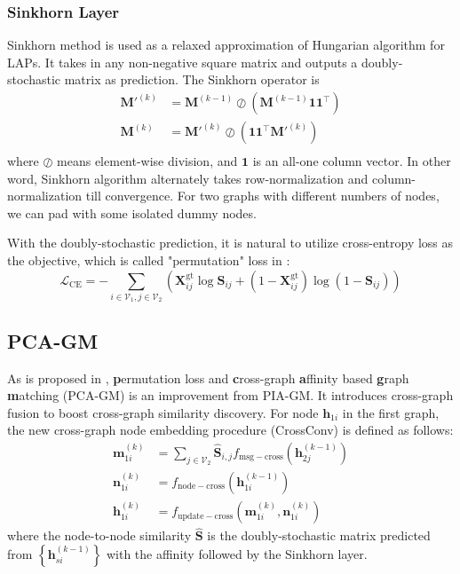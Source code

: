 \documentclass[a4paper]{article}
\newcommand{\set}[1]{\left\{#1\right\}}
\begin{document}
\subsubsection{Sinkhorn Layer}
Sinkhorn \cite{sinkhorn} method is used as a relaxed approximation of Hungarian algorithm \cite{hungarian} for LAPs. It takes in any non-negative square matrix and outputs a doubly-stochastic matrix as prediction. The Sinkhorn operator is
\begin{align}
    \mathbf{M}'^{(k)} &=\mathbf{M}^{(k-1)} \oslash \left(\mathbf{M}^{(k-1)}\mathbf{1}\mathbf{1}^\top\right)\\
    \mathbf{M}^{(k)} &=\mathbf{M}'^{(k)} \oslash \left(\mathbf{1}\mathbf{1}^\top\mathbf{M}'^{(k)}\right)\\
\end{align}
where $\oslash$ means element-wise division, and $\mathbf{1}$ is an all-one column vector. In other word, Sinkhorn algorithm alternately takes row-normalization and column-normalization till convergence. For two graphs with different numbers of nodes, we can pad with some isolated dummy nodes.

With the doubly-stochastic prediction, it is natural to utilize cross-entropy loss as the objective, which is called "permutation" loss in \cite{pca-ipca}:
$$
\mathcal{L}_{\mathrm{CE}} = -\sum_{i\in \mathcal{V}_1, j\in \mathcal{V}_2 } \left(\mathbf{X}_{ij}^{\mathrm{gt}} \log\mathbf{S}_{ij} + \left(1-\mathbf{X}_{ij}^{\mathrm{gt}}\right) \log \left(1- \mathbf{S}_{ij}\right) \right)
$$

\subsection{PCA-GM}
As is proposed in \cite{pca-ipca}, \textbf{p}ermutation loss and \textbf{c}ross-graph \textbf{a}ffinity based \textbf{g}raph \textbf{m}atching (PCA-GM) is an improvement from PIA-GM. It introduces cross-graph fusion to boost cross-graph similarity discovery. For node $\mathbf{h}_{1i}$ in the first graph, the new cross-graph node embedding procedure (CrossConv) is defined as follows:
\begin{align}
    \mathbf{m}_{1i}^{(k)} &= \sum_{j\in \mathcal{V}_2} \hat{\mathbf{S}}_{i,j} f_{\mathrm{msg-cross}}\left(\mathbf{h}_{2j}^{(k-1)}\right)\\
    \mathbf{n}_{1i}^{(k)} &= f_{\mathrm{node-cross}}\left( \mathbf{h}_{1i}^{(k-1)} \right)\\
    \mathbf{h}_{1i}^{(k)} &= f_{\mathrm{update-cross}}\left( \mathbf{m}_{1i}^{(k)}, \mathbf{n}_{1i}^{(k)} \right)
\end{align}
where the node-to-node similarity $\hat{\mathbf{S}}$ is the doubly-stochastic matrix predicted from $\set{\mathbf{h}_{si}^{(k-1)}}$ with the affinity followed by the Sinkhorn layer.
\end{document}
